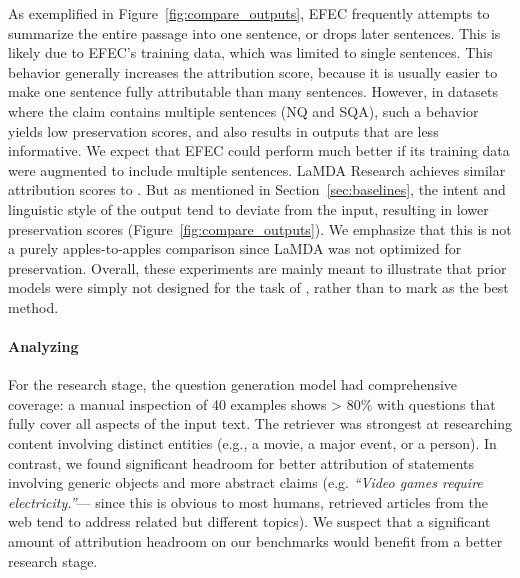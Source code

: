 \documentclass[11pt]{article}
\begin{document}
As exemplified in Figure~\ref{fig:compare_outputs},
EFEC frequently attempts to summarize the entire passage into one sentence, or drops later sentences. This is likely due to EFEC's training data, which was limited to single sentences. This behavior generally increases the attribution score, because it is usually easier to make one sentence fully attributable than many sentences.
However, in datasets where the claim contains multiple sentences (NQ and SQA), such a behavior yields low preservation scores, and also results in outputs that are less informative.
We expect that EFEC could perform much better if its training data were augmented to include multiple sentences. LaMDA Research achieves similar attribution scores to \approach{}.
But as mentioned in Section~\ref{sec:baselines}, the intent and linguistic style of the output tend to deviate from the input, resulting in lower preservation scores (Figure~\ref{fig:compare_outputs}).
We emphasize that this is not a purely apples-to-apples comparison since LaMDA was not optimized for preservation.
Overall, these experiments are mainly meant to illustrate that prior models were simply not designed for the task of \taskName, rather than to mark \approach{} as the best method.


\paragraph{Analyzing \approach{}}

For the research stage,
the question generation model had comprehensive coverage:
a manual inspection of 40 examples shows > 80\% with questions that fully cover all aspects of the input text.
The retriever was strongest at researching content involving distinct entities (e.g., a movie, a major event, or a person). In contrast, we found significant headroom for better attribution of statements involving generic objects and more abstract claims (e.g. \emph{``Video games require electricity.''}--- since this is obvious to most humans, retrieved articles from the web tend to address related but different topics).
We suspect that a significant amount of attribution headroom on our benchmarks would benefit from a better  research stage.
\end{document}
